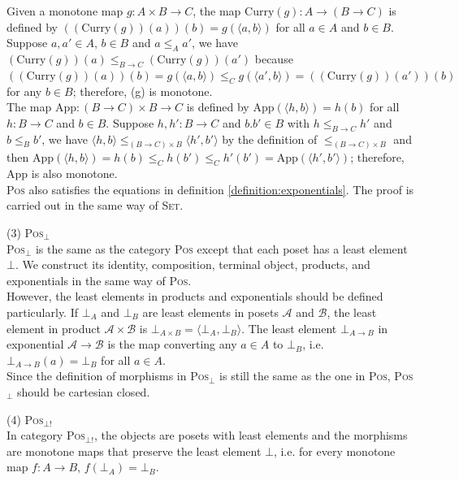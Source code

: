 \begin{myitemize}
\begin{myitemize}
  Given a monotone map $ g: A \times B \to C $, the map $ \text{Curry}(g): A \to (B \to C) $ is defined by $ ((\text{Curry}(g))(a))(b) = g( \langle a,b \rangle ) $ for all $ a \in A $ and $ b \in B $. Suppose $ a,a' \in A $, $ b \in B $ and $ a \leq_A a' $, we have $ (\text{Curry}(g))(a) \leq_{B \to C} (\text{Curry}(g))(a') $ because $ ((\text{Curry}(g))(a))(b) = g( \langle a,b \rangle ) \leq_C g( \langle a',b \rangle ) = ((\text{Curry}(g))(a'))(b) $ for any $ b \in B $; therefore, (g) is monotone.\\
  The map $ \text{App} : (B \to C) \times B \to C $ is defined by $ \text{App}( \langle h,b \rangle ) = h(b) $ for all $ h: B \to C $ and $ b \in B $. Suppose $ h,h': B \to C $ and $ b.b' \in B $ with $ h \leq_{B \to C} h' $ and $ b \leq_B b' $, we have $ \langle h,b \rangle \leq_{(B \to C) \times B} \langle h',b' \rangle $ by the definition of $ \leq_{(B \to C) \times B} $ and then $ \text{App}( \langle h,b \rangle ) = h(b) \leq_C h(b') \leq_C h'(b') = \text{App}( \langle h',b' \rangle ) $; therefore, $ \text{App} $ is also monotone.\\
  \textsc{Pos} also satisfies the equations in definition \ref{definition:exponentials}. The proof is carried out in the same way of \textsc{Set}.
  \end{myitemize}
  
\item[(3)] \textsc{Pos}$_\bot$\\
\textsc{Pos}$_\bot$ is the  same as the category \textsc{Pos} except that each poset has a least element $ \bot $. We construct its identity, composition, terminal object, products, and exponentials in the same way of \textsc{Pos}.\\
However, the least elements in products and exponentials should be defined particularly. If $ \bot _A $ and $ \bot _B $ are least elements in posets $ \mathcal{A} $ and $ \mathcal{B} $, the least element in product $ \mathcal{A} \times \mathcal{B} $ is $ \bot _{A \times B} = \langle \bot _A , \bot _B \rangle $. The least element $ \bot _{A \to B} $ in exponential $ \mathcal{A} \to \mathcal{B} $ is the map converting any $ a \in A $ to $ \bot _B $, i.e. $ \bot _{A \to B} (a) = \bot _B $ for all $ a \in A $.\\
Since the definition of morphisms in \textsc{Pos}$_\bot$ is still the same as the one in \textsc{Pos}, \textsc{Pos}$_\bot$ should be cartesian closed.

\item[(4)] \textsc{Pos}$_{\bot !}$ \\
In category \textsc{Pos}$_{\bot !}$, the objects are posets with least elements and the morphisms are monotone maps that preserve the least element $ \bot $, i.e. for every monotone map $ f: A \to B $, $ f( \bot _A ) = \bot _B $.


\end{myitemize}
